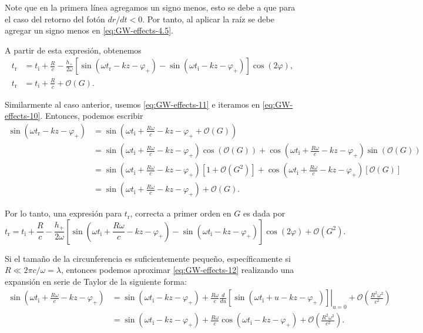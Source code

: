 \documentclass[letterpaper,11pt]{article}
\begin{document}
Note que en la primera línea agregamos un signo menos, esto se debe a que para el caso del retorno del fotón $dr/dt < 0$. Por tanto, al aplicar la raíz se debe agregar un signo menos en \eqref{eq:GW-effects-4.5}.

A partir de esta expresión, obtenemos
\begin{align}
t_{\text{r}} &= t_{\text{i}} + \frac{R}{c} - \frac{h_{+}}{2\omega}\left[\sin(\omega t_{\text{r}} -kz - \varphi_{+}) - \sin(\omega t_{\text{i}} -kz - \varphi_{+})\right]\cos(2\varphi),  \label{eq:GW-effects-10} \\
t_{\text{r}} &= t_{\text{i}} + \frac{R}{c} + \mathcal{O}(G).  \label{eq:GW-effects-11}
\end{align}

Similarmente al caso anterior, usemos \eqref{eq:GW-effects-11} e iteramos en \eqref{eq:GW-effects-10}. Entonces, podemos escribir
\begin{align}
\sin(\omega t_{\text{r}} -kz - \varphi_{+}) &= \sin\left(\omega t_{\text{i}} + \frac{R\omega}{c} - kz - \varphi_{+} + \mathcal{O}(G) \right) \nonumber \\
&= \sin\left(\omega t_{\text{i}} + \frac{R\omega}{c} -kz - \varphi_{+}\right) \cos(\mathcal{O}(G) ) + \cos\left(\omega t_{\text{i}} + \frac{R\omega}{c} -kz - \varphi_{+}\right) \sin(\mathcal{O}(G) ) \nonumber \\
&= \sin\left(\omega t_{\text{i}} + \frac{R\omega}{c} -kz - \varphi_{+}\right) \left[1 + \mathcal{O}(G^2) \right] + \cos\left(\omega t_{\text{i}} + \frac{R\omega}{c} -kz - \varphi_{+}\right) \left[ \mathcal{O}(G) \right]\nonumber \\
&= \sin\left(\omega t_{\text{i}} + \frac{R\omega}{c} -kz - \varphi_{+}\right) + \mathcal{O}(G).
\end{align}

Por lo tanto, una expresión para $t_{\text{r}}$, correcta a primer orden en $G$ es dada por
\begin{equation}
t_{\text{r}} = t_{\text{i}} + \frac{R}{c} - \frac{h_{+}}{2\omega} \left[\sin\left(\omega t_{\text{i}} + \frac{R\omega}{c} -kz - \varphi_{+}\right) - \sin(\omega t_{\text{i}} -kz - \varphi_{+}) \right] \cos(2\varphi) + \mathcal{O}(G^2). \label{eq:GW-effects-12}
\end{equation}

Si el tamaño de la circunferencia es suficientemente pequeño, específicamente si $R \ll 2\pi c/\omega = \lambda$, entonces podemos aproximar  \eqref{eq:GW-effects-12} realizando una expansión en serie de Taylor de la siguiente forma:
\begin{align}
\sin\left(\omega t_{\text{i}} + \frac{R\omega}{c} - kz - \varphi_{+}\right) &= \sin\left(\omega t_{\text{i}}  - kz - \varphi_{+}\right) + \left. \frac{R\omega}{c} \frac{d}{d u} [\sin(\omega t_{\text{i}} + u - kz - \varphi_{+})] \right|_{u = 0} + \mathcal{O}\left(\frac{R^2\omega^2}{c^2} \right) \nonumber \\
&= \sin\left(\omega t_{\text{i}}  - kz - \varphi_{+}\right) +  \frac{R\omega}{c} \cos(\omega t_{\text{i}}  - kz - \varphi_{+})  + \mathcal{O}\left(\frac{R^2\omega^2}{c^2} \right) . \label{eq:GW-effects-13}
\end{align}
\end{document}
